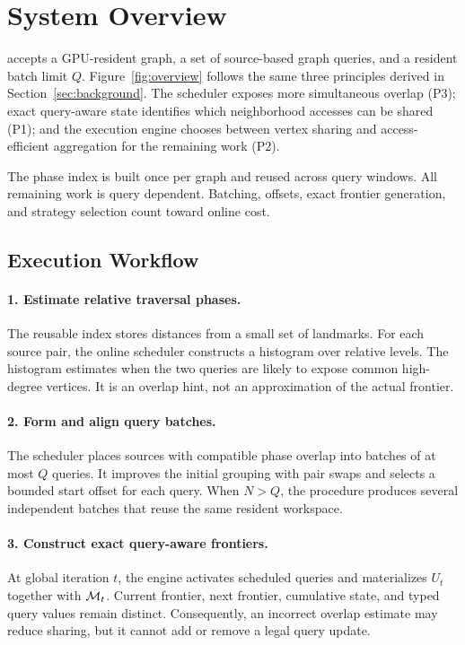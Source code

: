 \section{System Overview}
\label{sec:overview}



\system accepts a GPU-resident graph, a set of source-based graph queries, and a resident batch limit $Q$.  Figure~\ref{fig:overview} follows the same three principles derived in Section~\ref{sec:background}.  The scheduler exposes more simultaneous overlap (P3); exact query-aware state identifies which neighborhood accesses can be shared (P1); and the execution engine chooses between vertex sharing and access-efficient aggregation for the remaining work (P2).

The phase index is built once per graph and reused across query windows.  All remaining work is query dependent.  Batching, offsets, exact frontier generation, and strategy selection count toward online cost.

\subsection{Execution Workflow}

\paragraph{1. Estimate relative traversal phases.}
The reusable index stores distances from a small set of landmarks.  For each source pair, the online scheduler constructs a histogram over relative levels.  The histogram estimates when the two queries are likely to expose common high-degree vertices.  It is an overlap hint, not an approximation of the actual frontier.

\paragraph{2. Form and align query batches.}
The scheduler places sources with compatible phase overlap into batches of at most $Q$ queries.  It improves the initial grouping with pair swaps and selects a bounded start offset for each query.  When $N>Q$, the procedure produces several independent batches that reuse the same resident workspace.

\paragraph{3. Construct exact query-aware frontiers.}
At global iteration $t$, the engine activates scheduled queries and materializes $U_t$ together with $\mathcal{M}_t$.  Current frontier, next frontier, cumulative state, and typed query values remain distinct.  Consequently, an incorrect overlap estimate may reduce sharing, but it cannot add or remove a legal query update.

